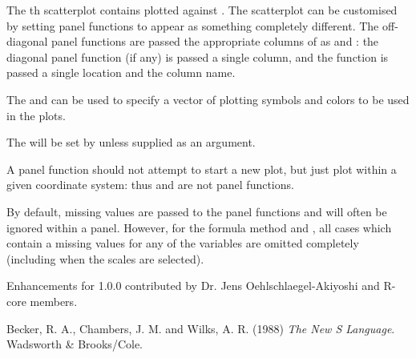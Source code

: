 %
\begin{Details}\relax
The th scatterplot contains  plotted against
.  The scatterplot can be customised by setting panel
functions to appear as something completely different. The
off-diagonal panel functions are passed the appropriate columns of
 as  and : the diagonal panel function (if
any) is passed a single column, and the  function is
passed a single  location and the column name.

The   and  can be used
to specify a vector of plotting symbols and colors to be used in the
plots.

The   will be set by
 unless supplied as an argument.

A panel function should not attempt to start a new plot, but just plot
within a given coordinate system: thus  and 
are not panel functions.

By default, missing values are passed to the panel functions and will
often be ignored within a panel.  However, for the formula method and
, all cases which contain a missing values for
any of the variables are omitted completely (including when the scales
are selected).
\end{Details}
%
\begin{Author}\relax
Enhancements for \R{} 1.0.0 contributed by Dr. Jens
Oehlschlaegel-Akiyoshi and R-core members.
\end{Author}
%
\begin{References}\relax
Becker, R. A., Chambers, J. M. and Wilks, A. R. (1988)
\emph{The New S Language}.
Wadsworth \& Brooks/Cole.
\end{References}
%
